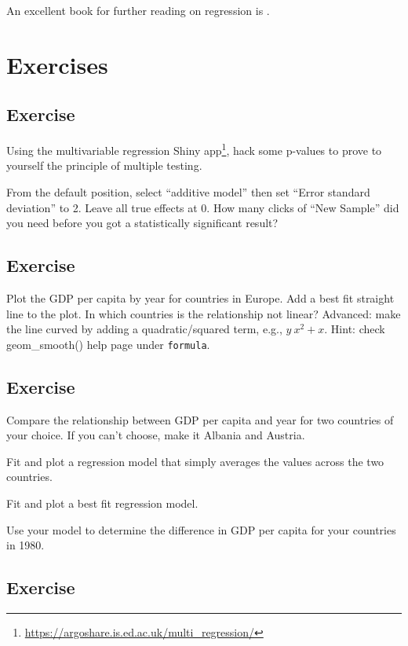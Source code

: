 \documentclass[
  12pt,
  krantz2]{krantz}
\renewcommand{\href}[2]{#2\footnote{\url{#1}}}
\begin{document}
An excellent book for further reading on regression is \citet{harrell2015}.

\hypertarget{exercises-2}{%
\section{Exercises}\label{exercises-2}}

\hypertarget{chap07-ex1}{%
\subsection{Exercise}\label{chap07-ex1}}

Using the \href{https://argoshare.is.ed.ac.uk/multi_regression/}{multivariable regression Shiny app}, hack some p-values to prove to yourself the principle of multiple testing.

From the default position, select ``additive model'' then set ``Error standard deviation'' to 2. Leave all true effects at 0. How many clicks of ``New Sample'' did you need before you got a statistically significant result?

\hypertarget{chap07-ex2}{%
\subsection{Exercise}\label{chap07-ex2}}

Plot the GDP per capita by year for countries in Europe.
Add a best fit straight line to the plot.
In which countries is the relationship not linear?
Advanced: make the line curved by adding a quadratic/squared term, e.g., \(y~x^2+x\). Hint: check geom\_smooth() help page under \texttt{formula}.

\hypertarget{chap07-ex3}{%
\subsection{Exercise}\label{chap07-ex3}}

Compare the relationship between GDP per capita and year for two countries of your choice.
If you can't choose, make it Albania and Austria.

Fit and plot a regression model that simply averages the values across the two countries.

Fit and plot a best fit regression model.

Use your model to determine the difference in GDP per capita for your countries in 1980.

\hypertarget{chap07-ex4}{%
\subsection{Exercise}\label{chap07-ex4}}
\end{document}
